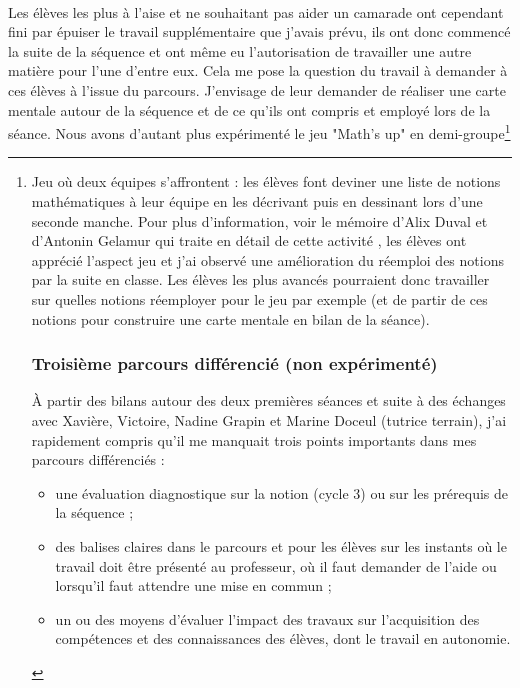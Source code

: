 \paragraph{}Les élèves les plus à l'aise et ne souhaitant pas aider un camarade ont cependant fini par épuiser le travail supplémentaire que j'avais prévu, ils ont donc commencé la suite de la séquence et ont même eu l'autorisation de travailler une autre matière pour l'une d'entre eux. Cela me pose la question du travail à demander à ces élèves à l'issue du parcours. J'envisage de leur demander de réaliser une carte mentale autour de la séquence et de ce qu'ils ont compris et employé lors de la séance. Nous avons d'autant plus expérimenté le jeu "Math's up" en demi-groupe\footnote{Jeu où deux équipes s'affrontent : les élèves font deviner une liste de notions mathématiques à leur équipe en les décrivant puis en dessinant lors d'une seconde manche. Pour plus d'information, voir le mémoire d'Alix Duval et d'Antonin Gelamur qui traite en détail de cette activité\cite{maths_up} , les élèves ont apprécié l'aspect jeu et j'ai observé une amélioration du réemploi des notions par la suite en classe. Les élèves les plus avancés pourraient donc travailler sur quelles notions réemployer pour le jeu par exemple (et de partir de ces notions pour construire une carte mentale en bilan de la séance).

\subsubsection{Troisième parcours différencié (non expérimenté)}
À partir des bilans autour des deux premières séances et suite à des échanges avec Xavière, Victoire, Nadine Grapin et Marine Doceul (tutrice terrain), j'ai rapidement compris qu'il me manquait trois points importants dans mes parcours différenciés :
\begin{itemize}
	\item une évaluation diagnostique sur la notion (cycle 3) ou sur les prérequis de la séquence ;
	\item des balises claires dans le parcours et pour les élèves sur les instants où le travail doit être présenté au professeur, où il faut demander de l'aide ou lorsqu'il faut attendre une mise en commun ;
	\item un ou des moyens d'évaluer l'impact des travaux sur l'acquisition des compétences et des connaissances des élèves, dont le travail en autonomie.
\end{itemize}
}
